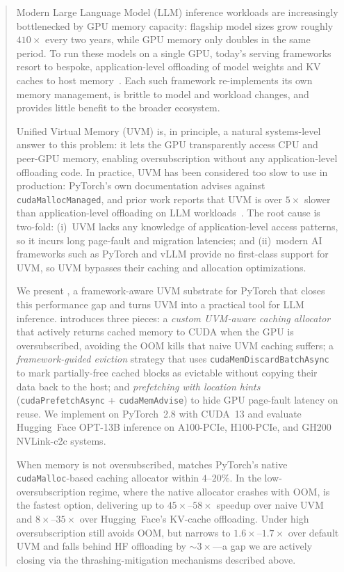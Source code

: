 \begin{abstract}
Modern Large Language Model (LLM) inference workloads
    are increasingly bottlenecked by GPU memory capacity:
    flagship model sizes grow roughly $410\times$ every two years,
    while GPU memory only doubles in the same period.
To run these models on a single GPU,
    today's serving frameworks resort to bespoke,
    application-level offloading of model weights and KV caches
    to host memory~\cite{flexgen, infinigen, headinfer, vllm}.
Each such framework re-implements its own memory management,
    is brittle to model and workload changes,
    and provides little benefit to the broader ecosystem.

Unified Virtual Memory (UVM) is, in principle,
    a natural systems-level answer to this problem:
    it lets the GPU transparently access CPU and peer-GPU memory,
    enabling oversubscription without any application-level offloading code.
In practice, UVM has been considered too slow to use in production:
    PyTorch's own documentation advises against \texttt{cudaMallocManaged},
    and prior work reports that UVM is over $5\times$ slower than
    application-level offloading on LLM workloads~\cite{infinigen}.
The root cause is two-fold:
    (i)~UVM lacks any knowledge of application-level access patterns,
        so it incurs long page-fault and migration latencies; and
    (ii)~modern AI frameworks such as PyTorch and vLLM
        provide no first-class support for UVM,
        so UVM bypasses their caching and allocation optimizations.

We present {\uvmname}, a framework-aware UVM substrate for PyTorch
    that closes this performance gap and turns UVM
    into a practical tool for LLM inference.
{\uvmname} introduces three pieces:
    a \emph{custom UVM-aware caching allocator}
        that actively returns cached memory to CUDA when the GPU is oversubscribed,
        avoiding the OOM kills that naive UVM caching suffers;
    a \emph{framework-guided eviction} strategy
        that uses \texttt{cudaMemDiscardBatchAsync} to mark partially-free
        cached blocks as evictable without copying their data back to the host;
    and \emph{prefetching with location hints}
        (\texttt{cudaPrefetchAsync} + \texttt{cudaMemAdvise})
        to hide GPU page-fault latency on reuse.
We implement {\uvmname} on PyTorch~2.8 with CUDA~13
    and evaluate Hugging~Face OPT-13B inference
    on A100-PCIe, H100-PCIe, and GH200 NVLink-c2c systems.

When memory is not oversubscribed, {\uvmname} matches PyTorch's native
    \texttt{cudaMalloc}-based caching allocator within $4$--$20\%$.
In the low-oversubscription regime, where the native allocator crashes with OOM,
    {\uvmname} is the fastest option,
    delivering up to $45\times$--$58\times$ speedup over naive UVM
    and $8\times$--$35\times$ over Hugging~Face's KV-cache offloading.
Under high oversubscription {\uvmname} still avoids OOM,
    but narrows to $1.6\times$--$1.7\times$ over default UVM
    and falls behind HF offloading by $\sim\!3\times$---a gap we are actively closing
    via the thrashing-mitigation mechanisms described above.
\end{abstract}
